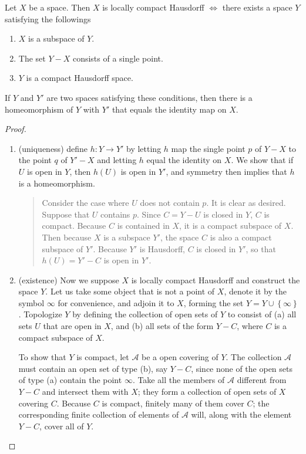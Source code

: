 \begin{theorem}
  Let \( X \) be a space.
  Then \( X \) is locally compact Hausdorff \( \iff \) there exists a space \( Y \) satisfying the followings
  \begin{enumerate}
    \item \( X \) is a subspace of \( Y \).
    \item The set \( Y - X \) consists of a single point.
    \item \( Y \) is a compact Hausdorff space.
  \end{enumerate}
  If \( Y \) and \( Y' \) are two spaces satisfying these conditions, then there is a homeomorphism of \( Y \) with \( Y' \) that equals the identity map on \( X \).
\end{theorem}
\begin{proof}
  \begin{enumerate}
    \item (uniqueness) define \( h: Y \to Y' \) by letting \( h \) map the single point \( p \) of \( Y - X \) to the point \( q \) of \( Y' - X \) and letting \( h \) equal the identity on \( X \).
      We show that if \( U \) is open in \( Y \), then \( h(U) \) is open in \( Y' \), and symmetry then implies that \( h \) is a homeomorphism.
      \begin{quote}
         Consider the case where \( U \) does not contain \( p \).
         It is clear as desired.
         Suppose that \( U \) contains \( p \).
         Since \( C = Y - U \) is closed in \( Y \), \( C \) is compact.
         Because \( C \) is contained in \( X \), it is a compact subspace of \( X \).
         Then because \( X \) is a subspace \( Y' \), the space \( C \) is also a compact subspace of \( Y' \).
         Because \( Y' \) is Hausdorff, \( C \) is closed in \( Y' \), so that \( h(U) = Y' - C \) is open in \( Y' \).
      \end{quote}
     \item (existence)
       Now we suppose \( X \) is locally compact Hausdorff and construct the space \( Y \).
       Let us take some object that is not a point of \( X \), denote it by the symbol \( \infty \) for convenience, and adjoin it to \( X \), forming the set \( Y = Y \cup \left\lbrace \infty \right\rbrace \).
       Topologize \( Y \) by defining the collection of open sets of \( Y \) to consist of (a) all sets \( U \) that are open in \( X \), and (b) all sets of the form \( Y - C \), where \( C \) is a compact subspace of \( X \).

         To show that \( Y \) is compact, let \( \mathcal{A} \) be a open covering of \( Y \).
         The collection \( \mathcal{A} \) must contain an open set of type (b), say \( Y - C \), since none of the open sets of type (a) contain the point \( \infty \).
         Take all the members of \( \mathcal{A} \) different from \( Y - C \) and intersect them with \( X \); they form a collection of open sets of \( X \) covering \( C \).
         Because \( C \) is compact, finitely many of them cover \( C \); the corresponding finite collection of elements of \( \mathcal{A} \) will, along with the element \( Y - C \), cover all of \( Y \).


\end{enumerate}
\end{proof}
